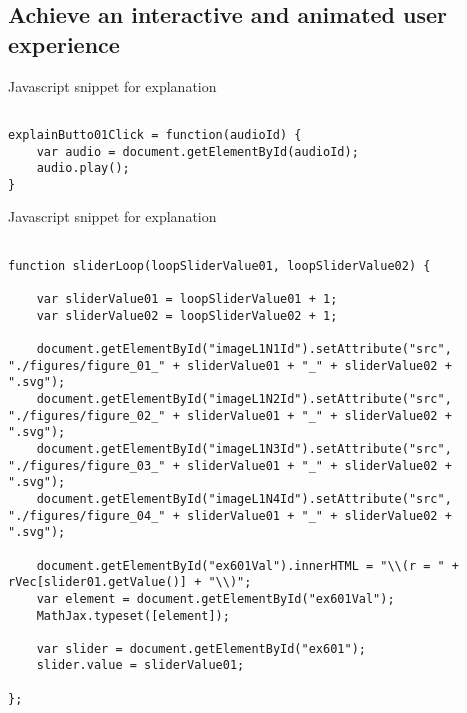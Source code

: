\documentclass{article}
\begin{document}
\subsection{Achieve an interactive and animated user experience}

\begin{CodeSnippet}[!hp]
	\centering
	\caption{Javascript snippet for explanation}
	\begin{BVerbatim}

explainButto01Click = function(audioId) {
	var audio = document.getElementById(audioId);
	audio.play();
}

	\end{BVerbatim}
	\vspace*{-2mm}
	\label{CodSni01}
\end{CodeSnippet}

\begin{CodeSnippet}[!hp]
	\centering
	\caption{Javascript snippet for explanation}
	\begin{BVerbatim}
		
function sliderLoop(loopSliderValue01, loopSliderValue02) {
	
	var sliderValue01 = loopSliderValue01 + 1;
	var sliderValue02 = loopSliderValue02 + 1;
	
	document.getElementById("imageL1N1Id").setAttribute("src", "./figures/figure_01_" + sliderValue01 + "_" + sliderValue02 + ".svg");
	document.getElementById("imageL1N2Id").setAttribute("src", "./figures/figure_02_" + sliderValue01 + "_" + sliderValue02 + ".svg");
	document.getElementById("imageL1N3Id").setAttribute("src", "./figures/figure_03_" + sliderValue01 + "_" + sliderValue02 + ".svg");
	document.getElementById("imageL1N4Id").setAttribute("src", "./figures/figure_04_" + sliderValue01 + "_" + sliderValue02 + ".svg");
	
	document.getElementById("ex601Val").innerHTML = "\\(r = " + rVec[slider01.getValue()] + "\\)";
	var element = document.getElementById("ex601Val");
	MathJax.typeset([element]);
	
	var slider = document.getElementById("ex601");
	slider.value = sliderValue01;
	
};
		
	\end{BVerbatim}
	\vspace*{-2mm}
	\label{CodSni01}
\end{CodeSnippet}
\end{document}
